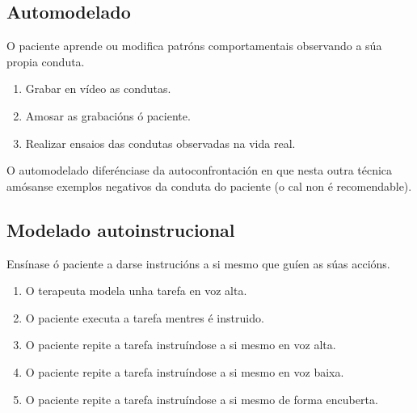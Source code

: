 \documentclass[a4paper,11pt]{article}
\begin{document}
\subsection{Automodelado}
O paciente aprende ou modifica patróns comportamentais observando a súa propia conduta.
\begin{enumerate}
	\item Grabar en vídeo as condutas. 
	\item Amosar as grabacións ó paciente.
	\item Realizar ensaios das condutas observadas na vida real.
\end{enumerate}

O automodelado diferénciase da autoconfrontación en que nesta outra técnica amósanse exemplos negativos da conduta do paciente (o cal non é recomendable).

\subsection{Modelado autoinstrucional}
Ensínase ó paciente a darse instrucións a si mesmo que guíen as súas accións.
\begin{enumerate}
	\item O terapeuta modela unha tarefa en voz alta.
	\item O paciente executa a tarefa mentres é instruido.
	\item O paciente repite a tarefa instruíndose a si mesmo en voz alta.
	\item O paciente repite a tarefa instruíndose a si mesmo en voz baixa.
	\item O paciente repite a tarefa instruíndose a si mesmo de forma encuberta. 
\end{enumerate}
\end{document}
